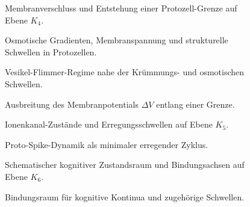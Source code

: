\begin{figure}[p]
  \centering
  
  \caption{Membranverschluss und Entstehung einer Protozell-Grenze auf Ebene
           \texorpdfstring{\(K_4\)}{K_4}.}
  \label{fig:membrane-closure}
\end{figure}

\begin{figure}[p]
  \centering
  
  \caption{Osmotische Gradienten, Membranspannung und strukturelle Schwellen in
           Protozellen.}
  \label{fig:gradient-osmosis-tension}
\end{figure}

\begin{figure}[p]
  \centering
  
  \caption{Vesikel-Flimmer-Regime nahe der Krümmungs- und osmotischen
           Schwellen.}
  \label{fig:vesicle-flickering}
\end{figure}

\begin{figure}[p]
  \centering
  
  \caption{Ausbreitung des Membranpotentials
           \texorpdfstring{\(\Delta V\)}{\Delta V} entlang einer Grenze.}
  \label{fig:dv-propagation-membrane}
\end{figure}

\begin{figure}[p]
  \centering
  
  \caption{Ionenkanal-Zustände und Erregungsschwellen auf Ebene
           \texorpdfstring{\(K_5\)}{K_5}.}
  \label{fig:ion-channel-states}
\end{figure}

\begin{figure}[p]
  \centering
  
  \caption{Proto-Spike-Dynamik als minimaler erregender Zyklus.}
  \label{fig:proto-spike}
\end{figure}

\begin{figure}[p]
  \centering
  
  \caption{Schematischer kognitiver Zustandsraum und Bindungsachsen auf Ebene
           \texorpdfstring{\(K_6\)}{K_6}.}
  \label{fig:cognitive-state-space}
\end{figure}

\begin{figure}[p]
  \centering
  
  \caption{Bindungsraum für kognitive Kontinua und zugehörige Schwellen.}
  \label{fig:binding-space}
\end{figure}

